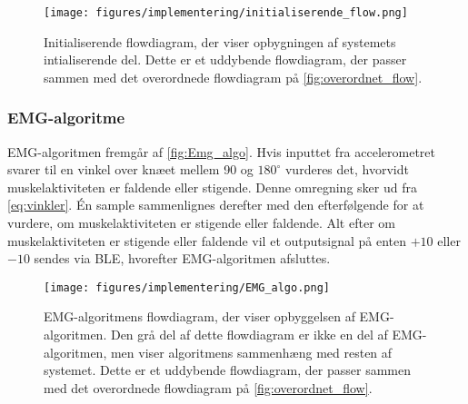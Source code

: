 \begin{figure}[H]
\centering
\texttt{[image: figures/implementering/initialiserende\_flow.png]}
\caption{Initialiserende flowdiagram, der viser opbygningen af systemets intialiserende del. Dette er et uddybende flowdiagram, der passer sammen med det overordnede flowdiagram på \autoref{fig:overordnet_flow}.}
\label{fig:initialiserende_flow}
\end{figure}

\subsubsection{EMG-algoritme}
EMG-algoritmen fremgår af \autoref{fig:Emg_algo}. 
Hvis inputtet fra accelerometret svarer til en vinkel over knæet mellem 90 og $180^{\circ}$ vurderes det, hvorvidt muskelaktiviteten er faldende eller stigende. 
Denne omregning sker ud fra \autoref{eq:vinkler}. 
Én sample sammenlignes derefter med den efterfølgende for at vurdere, om muskelaktiviteten er stigende eller faldende. Alt efter om muskelaktiviteten er stigende eller faldende vil et outputsignal på enten $+10$ eller $-10$ sendes via BLE, hvorefter EMG-algoritmen afsluttes. 

\begin{figure}[H]
\centering
\texttt{[image: figures/implementering/EMG\_algo.png]}
\caption{EMG-algoritmens flowdiagram, der viser opbyggelsen af EMG-algoritmen. Den grå del af dette flowdiagram er ikke en del af EMG-algoritmen, men viser algoritmens sammenhæng med resten af systemet. Dette er et uddybende flowdiagram, der passer sammen med det overordnede flowdiagram på \autoref{fig:overordnet_flow}.}
\label{fig:Emg_algo}
\end{figure}

